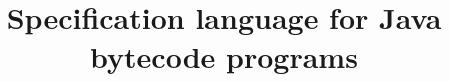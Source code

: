 \documentclass[10pt]{article}
\title{Specification language for Java bytecode programs}
\begin{document}
\date{}
\renewcommand{\topfraction}{0.9}
\renewcommand{\textfraction}{0.05}
\renewcommand{\floatpagefraction}{0.75}

\maketitle
\tableofcontents
\newpage
   
  
  
  
  


\end{document}
